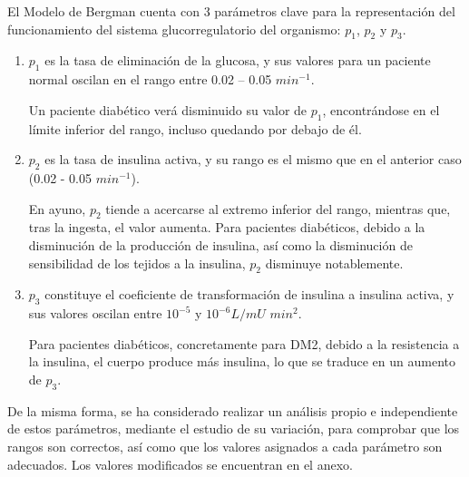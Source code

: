 El Modelo de Bergman cuenta con 3 parámetros clave para la representación del funcionamiento del sistema glucorregulatorio del organismo: $p_1$, $p_2$ y $p_3$.
\begin{enumerate}
    \item $p_1$ es la tasa de eliminación de la glucosa, y sus valores para un paciente normal oscilan en el rango entre 0.02 – 0.05 $min^{-1}$. 
    
    Un paciente diabético verá disminuido su valor de $p_1$, encontrándose en el límite inferior del rango, incluso quedando por debajo de él.
    
    \item $p_2$ es la tasa de insulina activa, y su rango es el mismo que en el anterior caso (0.02 - 0.05 $min^{-1}$). 
   
    En ayuno, $p_2$  tiende a acercarse al extremo inferior del rango, mientras que, tras la ingesta, el valor aumenta. Para pacientes diabéticos, debido a la disminución de la producción de insulina, así como la disminución de sensibilidad de los tejidos a la insulina, $p_2$  disminuye notablemente.
    
    \item $p_3$ constituye el coeficiente de transformación de insulina a insulina activa, y sus valores oscilan entre $10^{-5}$ y $10^{-6}
    L/mU$ $min ^2$. 
    
    Para pacientes diabéticos, concretamente para DM2, debido a la resistencia a la insulina, el cuerpo produce más insulina, lo que se traduce en un aumento de $p_3$.
\end{enumerate}

De la misma forma, se ha considerado realizar un análisis propio e independiente de estos parámetros, mediante el estudio de su variación, para comprobar que los rangos son correctos, así como que los valores asignados a cada parámetro son adecuados. Los valores modificados se encuentran en el anexo.

